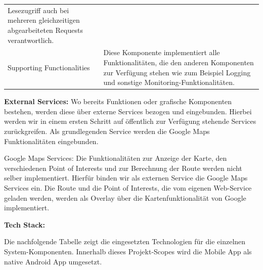 \documentclass[a4paper,10pt,xetex]{article}
\begin{document}
\begin{longtable}[]{@{}ll@{}}
\begin{minipage}[t]{0.83\columnwidth}
Lesezugriff auch bei mehreren gleichzeitigen abgearbeiteten Requests
verantwortlich.\strut
\end{minipage}\tabularnewline
\begin{minipage}[t]{0.11\columnwidth}\raggedright\strut
Supporting Functionalities\strut
\end{minipage} & \begin{minipage}[t]{0.83\columnwidth}\raggedright\strut
Diese Komponente implementiert alle Funktionalitäten, die den anderen
Komponenten zur Verfügung stehen wie zum Beispiel Logging und sonstige
Monitoring-Funktionalitäten.\strut
\end{minipage}\tabularnewline
\bottomrule
\end{longtable}

\textbf{External Services:} Wo bereits Funktionen oder grafische
Komponenten bestehen, werden diese über externe Services bezogen und
eingebunden. Hierbei werden wir in einem ersten Schritt auf öffentlich
zur Verfügung stehende Services zurückgreifen. Als grundlegenden Service
werden die Google Maps Funktionalitäten eingebunden.

Google Maps Services: Die Funktionalitäten zur Anzeige der Karte, den
verschiedenen Point of Interests und zur Berechnung der Route werden
nicht selber implementiert. Hierfür binden wir als externen Service die
Google Maps Services ein. Die Route und die Point of Interests, die vom
eigenen Web-Service geladen werden, werden als Overlay über die
Kartenfunktionalität von Google implementiert.

\textbf{Tech Stack:}

Die nachfolgende Tabelle zeigt die eingesetzten Technologien für die
einzelnen System-Komponenten. Innerhalb dieses Projekt-Scopes wird die
Mobile App als native Android App umgesetzt.
\end{document}
